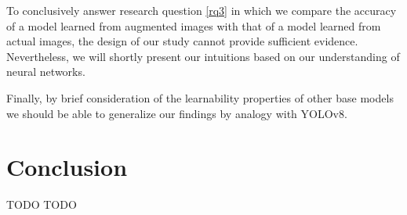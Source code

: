 \documentclass[]{article}
\begin{document}
	To conclusively answer research question \ref{rq3} in which we compare the accuracy of a model learned from augmented images with that of a model learned from actual images, the design of our study cannot provide sufficient evidence. Nevertheless, we will shortly present our intuitions based on our understanding of neural networks.
	
	Finally, by brief consideration of the learnability properties of other base models we should be able to generalize our findings by analogy with YOLO{\small v8}.	

\section{Conclusion}

TODO TODO

\printbibliography
\end{document}
